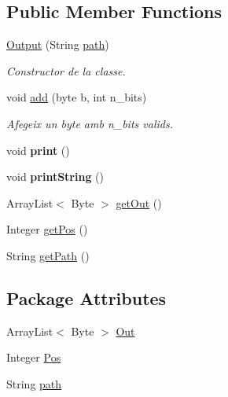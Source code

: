\subsection*{Public Member Functions}
\begin{DoxyCompactItemize}
\item 
\hyperlink{classpersistencia_1_1output_1_1Output_acbb70ea9eabb2a6d0b2d7bd2f3c9009a}{Output} (String \hyperlink{classpersistencia_1_1output_1_1Output_aebef717882f3bcc7080dec014c6714c9}{path})
\begin{DoxyCompactList}\small\item\em Constructor de la classe. \end{DoxyCompactList}\item 
void \hyperlink{classpersistencia_1_1output_1_1Output_adc03a0dd7a94da21fe8432064a4eec09}{add} (byte b, int n\+\_\+bits)
\begin{DoxyCompactList}\small\item\em Afegeix un byte amb n\+\_\+bits valids. \end{DoxyCompactList}\item 
\mbox{\label{classpersistencia_1_1output_1_1Output_a416850e57f55bd371d60b2aae8e7e983}} 
void {\bfseries print} ()
\item 
\mbox{\label{classpersistencia_1_1output_1_1Output_ae6398e0602d281fd044d6557a16eb727}} 
void {\bfseries print\+String} ()
\item 
Array\+List$<$ Byte $>$ \hyperlink{classpersistencia_1_1output_1_1Output_ae4f870c86bed5b445125df989b313b9f}{get\+Out} ()
\item 
Integer \hyperlink{classpersistencia_1_1output_1_1Output_a01f862217e01efb59bc2eff3fe54006f}{get\+Pos} ()
\item 
String \hyperlink{classpersistencia_1_1output_1_1Output_ae33fc52334f791b6d4d7aebf2931df8d}{get\+Path} ()
\end{DoxyCompactItemize}
\subsection*{Package Attributes}
\begin{DoxyCompactItemize}
\item 
Array\+List$<$ Byte $>$ \hyperlink{classpersistencia_1_1output_1_1Output_ab993115d43930b7fb69e5d1c99addfba}{Out}
\item 
Integer \hyperlink{classpersistencia_1_1output_1_1Output_a3709182600423f7e57644ccdd0016f22}{Pos}
\item 
String \hyperlink{classpersistencia_1_1output_1_1Output_aebef717882f3bcc7080dec014c6714c9}{path}
\end{DoxyCompactItemize}


